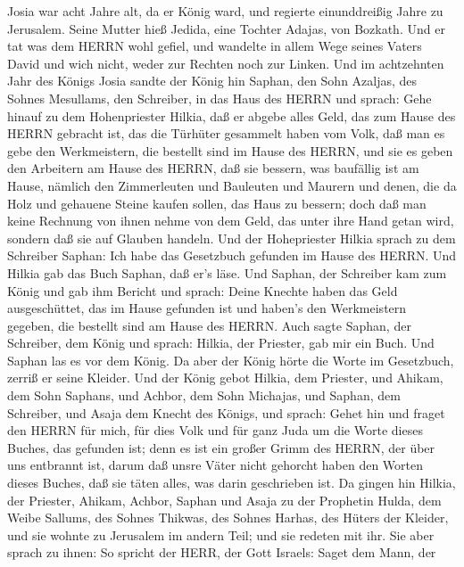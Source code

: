  Josia war acht Jahre alt, da er König ward, und regierte
einunddreißig Jahre zu Jerusalem. Seine Mutter hieß Jedida, eine Tochter
Adajas, von Bozkath.  Und er tat was dem HERRN wohl gefiel,
und wandelte in allem Wege seines Vaters David und wich nicht, weder zur
Rechten noch zur Linken.  Und im achtzehnten Jahr des Königs
Josia sandte der König hin Saphan, den Sohn Azaljas, des Sohnes
Mesullams, den Schreiber, in das Haus des HERRN und sprach: 
Gehe hinauf zu dem Hohenpriester Hilkia, daß er abgebe alles Geld, das
zum Hause des HERRN gebracht ist, das die Türhüter gesammelt haben vom
Volk,  daß man es gebe den Werkmeistern, die bestellt sind
im Hause des HERRN, und sie es geben den Arbeitern am Hause des HERRN,
daß sie bessern, was baufällig ist am Hause,  nämlich den
Zimmerleuten und Bauleuten und Maurern und denen, die da Holz und
gehauene Steine kaufen sollen, das Haus zu bessern;  doch
daß man keine Rechnung von ihnen nehme von dem Geld, das unter ihre Hand
getan wird, sondern daß sie auf Glauben handeln.  Und der
Hohepriester Hilkia sprach zu dem Schreiber Saphan: Ich habe das
Gesetzbuch gefunden im Hause des HERRN. Und Hilkia gab das Buch Saphan,
daß er's läse.  Und Saphan, der Schreiber kam zum König und
gab ihm Bericht und sprach: Deine Knechte haben das Geld ausgeschüttet,
das im Hause gefunden ist und haben's den Werkmeistern gegeben, die
bestellt sind am Hause des HERRN.  Auch sagte Saphan, der
Schreiber, dem König und sprach: Hilkia, der Priester, gab mir ein Buch.
Und Saphan las es vor dem König.  Da aber der König hörte
die Worte im Gesetzbuch, zerriß er seine Kleider.  Und der
König gebot Hilkia, dem Priester, und Ahikam, dem Sohn Saphans, und
Achbor, dem Sohn Michajas, und Saphan, dem Schreiber, und Asaja dem
Knecht des Königs, und sprach:  Gehet hin und fraget den
HERRN für mich, für dies Volk und für ganz Juda um die Worte dieses
Buches, das gefunden ist; denn es ist ein großer Grimm des HERRN, der
über uns entbrannt ist, darum daß unsre Väter nicht gehorcht haben den
Worten dieses Buches, daß sie täten alles, was darin geschrieben ist.
 Da gingen hin Hilkia, der Priester, Ahikam, Achbor, Saphan
und Asaja zu der Prophetin Hulda, dem Weibe Sallums, des Sohnes Thikwas,
des Sohnes Harhas, des Hüters der Kleider, und sie wohnte zu Jerusalem
im andern Teil; und sie redeten mit ihr.  Sie aber sprach
zu ihnen: So spricht der HERR, der Gott Israels: Saget dem Mann, der
